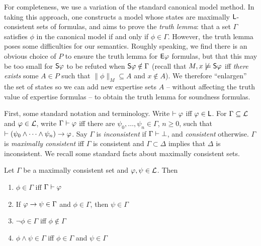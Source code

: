 For completeness, we use a variation of the standard canonical model method.
In taking this approach, one constructs a model whose states are maximally
$\sL$-consistent sets of formulas, and aims to prove the \emph{truth lemma}:
that a set $\Gamma$ satisfies $\phi$ in the canonical model if and only if
$\phi \in \Gamma$. However, the truth lemma poses some difficulties for our
semantics. Roughly speaking, we find there is an obvious choice of $P$ to
ensure the truth lemma for $\E\phi$ formulas, but that this may be too small
for $\S\phi$ to be refuted when $\S\phi \notin \Gamma$ (recall that $M, x
\not\models \S\phi$ iff \emph{there exists} some $A \in P$ such that
$\|\phi\|_M \subseteq A$ and $x \notin A$). We therefore ``enlargen'' the set of
states so we can add new expertise sets $A$ -- without affecting the truth
value of expertise formulas -- to obtain the truth lemma for soundness
formulas.

First, some standard notation and terminology. Write $\thm \phi$ iff
$\phi \in \sL$. For $\Gamma \subseteq \cL$ and $\phi \in \cL$, write $\Gamma
\thm \phi$ iff there are $\psi_0, \ldots, \psi_n \in \Gamma$, $n \ge 0$, such
that $\thm (\psi_0 \land \cdots \land \psi_n) \limplies \phi$.  Say $\Gamma$
is \emph{inconsistent} if $\Gamma \entails \bot$, and
\emph{consistent} otherwise. $\Gamma$ is \emph{maximally
consistent} iff $\Gamma$ is consistent and $\Gamma \subset \Delta$ implies that
$\Delta$ is inconsistent. We recall some standard facts about maximally
consistent sets.

\begin{lemma}
\label{exp_lemma_mcs_facts}
    Let $\Gamma$ be a maximally consistent set and $\phi, \psi \in \cL$. Then
    \begin{enumerate}
        \item\label{exp_item_mcs_mem_entail} $\phi \in \Gamma$ iff $\Gamma \entails
            \phi$

        \item\label{exp_item_mcs_modpon} If $\phi \limplies \psi \in \Gamma$ and
            $\phi \in \Gamma$, then $\psi \in \Gamma$

        \item\label{exp_item_mcs_negations} $\neg\phi \in \Gamma$ iff $\phi \notin
            \Gamma$

        \item\label{exp_item_mcs_conjunctions} $\phi \land \psi \in \Gamma$ iff
            $\phi \in \Gamma$ and $\psi \in \Gamma$
    \end{enumerate}
\end{lemma}


